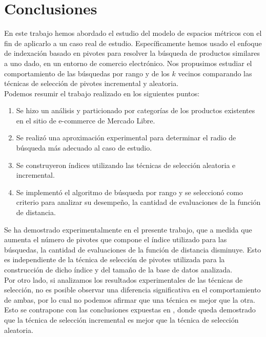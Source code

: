 \chapter{Conclusiones}

En este trabajo hemos abordado el estudio del modelo de espacios m\'etricos con el fin de aplicarlo a un caso real de estudio. Específicamente hemos usado el enfoque de indexaci\'on basado en pivotes para resolver la b\'usqueda de productos similares a uno dado, en un entorno de comercio electr\'onico. Nos propusimos estudiar el comportamiento de las b\'usquedas por rango y de los $k$ vecinos comparando las t\'ecnicas de selecci\'on de pivotes incremental y aleatoria.\\

Podemos resumir el trabajo realizado en los siguientes puntos:\\

\begin{enumerate}
\item Se hizo un an\'alisis y particionado por categor\'ias de los productos existentes en el sitio de e-commerce de Mercado Libre.
\item Se realiz\'o una aproximaci\'on experimental para determinar el radio de b\'usqueda m\'as adecuado al caso de estudio.
\item Se construyeron \'indices utilizando las t\'ecnicas de selecci\'on aleatoria e incremental.
\item Se implement\'o el algoritmo de b\'usqueda por rango y  se seleccion\'o como criterio para analizar su desempeño, la cantidad de evaluaciones de la funci\'on de distancia.
\end{enumerate}

Se ha demostrado experimentalmente en el presente trabajo, que a medida que aumenta el n\'umero de pivotes que compone el \'indice utilizado para las b\'usquedas, la cantidad de evaluaciones de la funci\'on de distancia disminuye. Esto es independiente de la t\'ecnica de selecci\'on de pivotes utilizada para la construcci\'on de dicho \'indice y del tamaño de la base de datos analizada.\\

Por otro lado, si analizamos los resultados experimentales de las t\'ecnicas de selecci\'on, no es posible observar una diferencia significativa en el comportamiento de ambas, por lo cual no podemos afirmar que una t\'ecnica es mejor que la otra. Esto se contrapone con las conclusiones expuestas en \cite{BNCsccc01}, donde queda demostrado que la t\'ecnica de selecci\'on incremental es mejor que la t\'ecnica de selecci\'on aleatoria.\\

